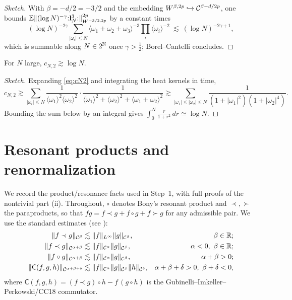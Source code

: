 \begin{proof}[Sketch]
With $\beta=-d/2=-3/2$ and the embedding $W^{\beta,2p}\hookrightarrow
\mathcal{C}^{\beta-d/2p}$, one bounds
$\mathbb{E}\|(\log N)^{-\gamma}{:}\mathbf{l}_N^3{:}\|_{W^{-3/2,2p}}^{2p}$ by a constant times
\[
(\log N)^{-2\gamma}\sum_{|\omega_i|\le N}\langle\omega_1+\omega_2+\omega_3\rangle^{-3}\prod_{i}\langle\omega_i\rangle^{-2}
\ \lesssim\ (\log N)^{-2\gamma+1},
\]
which is summable along $N\in2^{\mathbb{N}}$ once $\gamma>\tfrac12$; Borel--Cantelli
concludes.
\end{proof}

\begin{qonelemma}\label{lem:logdiv}
For $N$ large, $c_{N,2}\gtrsim\log N$.
\end{qonelemma}

\begin{proof}[Sketch]
Expanding \eqref{eq:cN2} and integrating the heat kernels in time,
\[
c_{N,2}\gtrsim\sum_{|\omega_i|\le N}\frac{1}{\langle\omega_1\rangle^2\langle\omega_2\rangle^2}\cdot\frac{1}{\langle\omega_1\rangle^2+\langle\omega_2\rangle^2+\langle\omega_1+\omega_2\rangle^2}
\gtrsim\sum_{|\omega_1|\le|\omega_2|\le N}\frac{1}{(1+|\omega_1|^2)(1+|\omega_2|^4)}.
\]
Bounding the sum below by an integral gives
$\int_0^N\frac{r}{1+r^2}\,dr\simeq\log N$.
\end{proof}

\section*{Resonant products and renormalization}

We record the product/resonance facts used in Step~1, with full proofs of the
nontrivial part (ii). Throughout, $\circ$ denotes Bony's resonant product and
$\prec,\succ$ the para\-products, so that $fg=f\prec g+f\circ g+f\succ g$ for any
admissible pair. We use the standard estimates (see \cite{CC18,Hairer14}):
\begin{align}
\|f\prec g\|_{\mathcal{C}^{\beta}}&\lesssim\|f\|_{L^\infty}\|g\|_{\mathcal{C}^{\beta}}, &\beta\in\mathbb{R};\label{eq:para1}\\
\|f\prec g\|_{\mathcal{C}^{\alpha+\beta}}&\lesssim\|f\|_{\mathcal{C}^{\alpha}}\|g\|_{\mathcal{C}^{\beta}}, &\alpha<0,\ \beta\in\mathbb{R};\label{eq:para2}\\
\|f\circ g\|_{\mathcal{C}^{\alpha+\beta}}&\lesssim\|f\|_{\mathcal{C}^{\alpha}}\|g\|_{\mathcal{C}^{\beta}}, &\alpha+\beta>0;\label{eq:res}\\
\|\mathsf C(f,g,h)\|_{\mathcal{C}^{\alpha+\beta+\delta}}&\lesssim\|f\|_{\mathcal{C}^{\alpha}}\|g\|_{\mathcal{C}^{\beta}}\|h\|_{\mathcal{C}^{\delta}}, &\alpha+\beta+\delta>0,\ \beta+\delta<0,\label{eq:comm}
\end{align}
where $\mathsf C(f,g,h)=(f\prec g)\circ h-f\,(g\circ h)$ is the Gubinelli--Imkeller--Perkowski/CC18 commutator.


